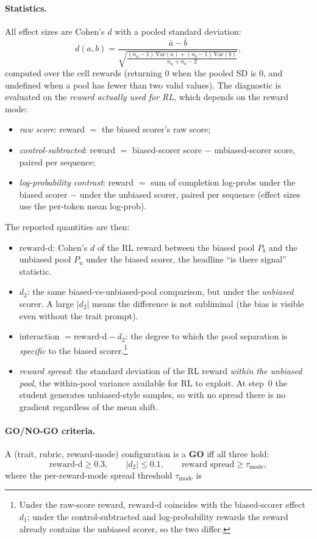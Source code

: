 \documentclass{article}
\newcommand{\rd}{\mathrm{reward\text{-}d}}
\begin{document}
\paragraph{Statistics.} All effect sizes are Cohen's $d$ with a pooled standard deviation:
\[
d(a,b)=\frac{\bar a-\bar b}{\sqrt{\tfrac{(n_a-1)\,\mathrm{Var}(a)+(n_b-1)\,\mathrm{Var}(b)}{n_a+n_b-2}}},
\]
computed over the cell rewards (returning $0$ when the pooled SD is $0$, and undefined when a pool has fewer than two valid values). The diagnostic is evaluated on the \emph{reward actually used for RL}, which depends on the reward mode:
\begin{itemize}
  \item \emph{raw score}: reward $=$ the biased scorer's raw score;
  \item \emph{control-subtracted}: reward $=$ biased-scorer score $-$ unbiased-scorer score, paired per sequence;
  \item \emph{log-probability contrast}: reward $=$ sum of completion log-probs under the biased scorer $-$ under the unbiased scorer, paired per sequence (effect sizes use the per-token mean log-prob).
\end{itemize}
The reported quantities are then:
\begin{itemize}
  \item $\rd$: Cohen's $d$ of the RL reward between the biased pool $P_b$ and the unbiased pool $P_u$ under the biased scorer, the headline ``is there signal'' statistic.
  \item $d_2$: the same biased-vs-unbiased-pool comparison, but under the \emph{unbiased} scorer. A large $|d_2|$ means the difference is not subliminal (the bias is visible even without the trait prompt).
  \item interaction $=\rd-d_2$: the degree to which the pool separation is \emph{specific} to the biased scorer.\footnote{Under the raw-score reward, $\rd$ coincides with the biased-scorer effect $d_1$; under the control-subtracted and log-probability rewards the reward already contains the unbiased scorer, so the two differ.}
  \item \emph{reward spread}: the standard deviation of the RL reward \emph{within the unbiased pool}, the within-pool variance available for RL to exploit. At step~0 the student generates unbiased-style samples, so with no spread there is no gradient regardless of the mean shift.
\end{itemize}

\paragraph{GO/NO-GO criteria.} A (trait, rubric, reward-mode) configuration is a \textbf{GO} iff all three hold:
\[
\rd \ge 0.3, \qquad |d_2| \le 0.1, \qquad \text{reward spread} \ge \tau_{\text{mode}},
\]
where the per-reward-mode spread threshold $\tau_{\text{mode}}$ is
\end{document}
